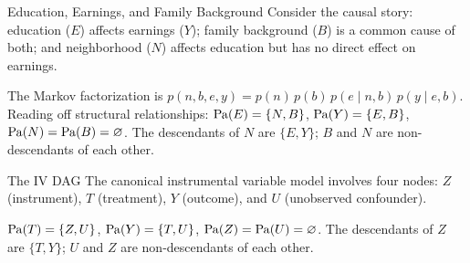 \documentclass[master.tex]{subfiles}
\begin{document}
\begin{example}{Education, Earnings, and Family Background}
Consider the causal story: education ($E$) affects earnings ($Y$); family
background ($B$) is a common cause of both; and neighborhood ($N$) affects
education but has no direct effect on earnings.

\begin{center}
\end{center}

The Markov factorization is $p(n,b,e,y) = p(n)\,p(b)\,p(e\mid n,b)\,p(y\mid e,b)$.
Reading off structural relationships: $\mathrm{Pa}(E) = \{N,B\}$,
$\mathrm{Pa}(Y) = \{E,B\}$, $\mathrm{Pa}(N)=\mathrm{Pa}(B)=\varnothing$.
The descendants of $N$ are $\{E,Y\}$; $B$ and $N$ are non-descendants of each other.
\end{example}

\begin{example}{The IV DAG}
The canonical instrumental variable model involves four nodes: $Z$ (instrument),
$T$ (treatment), $Y$ (outcome), and $U$ (unobserved confounder).

\begin{center}
\end{center}

$\mathrm{Pa}(T) = \{Z,U\}$, $\mathrm{Pa}(Y) = \{T,U\}$,
$\mathrm{Pa}(Z) = \mathrm{Pa}(U) = \varnothing$.
The descendants of $Z$ are $\{T, Y\}$; $U$ and $Z$ are non-descendants of each other.
\end{example}
\end{document}
